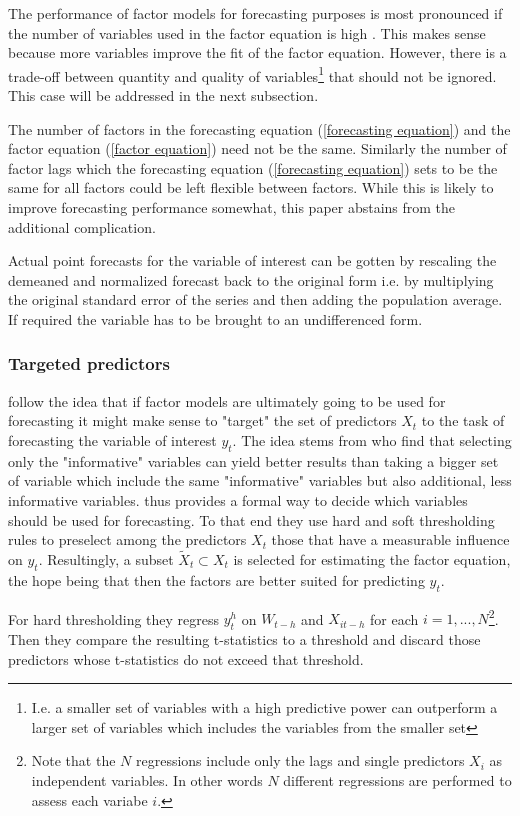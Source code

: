 \documentclass[12pt]{article}
\begin{document}
The performance of factor models for forecasting purposes is most pronounced if the number of variables used in the factor equation is high \citep{stock2011dynamic}. This makes sense because more variables improve the fit of the factor equation. However, there is a trade-off between quantity and quality of variables\footnote{I.e. a smaller set of variables with a high predictive power can outperform a larger set of variables which includes the variables from the smaller set} that should not be ignored. This case will be addressed in the next subsection.

The number of factors in the forecasting equation (\ref{forecasting equation}) and the factor equation (\ref{factor equation}) need not be the same. Similarly the number of factor lags which the forecasting equation (\ref{forecasting equation}) sets to be the same for all factors could be left flexible between factors. While this is likely to improve forecasting performance somewhat, this paper abstains from the additional complication.

Actual point forecasts for the variable of interest can be gotten by rescaling the demeaned and normalized forecast back to the original form i.e. by multiplying the original standard error of the series and then adding the population average. If required the variable has to be brought to an undifferenced form.

\subsubsection{Targeted predictors}
\citet{bai2008forecasting} follow the idea that if factor models are ultimately going to be used for forecasting it might make sense to "target" the set of predictors $X_t$ to the task of forecasting the variable of interest $y_t$. The idea stems from \citet{boivin2006more} who find that selecting only the "informative" variables can yield better results than taking a bigger set of variable which include the same "informative" variables but also additional, less informative variables. \citet{bai2008forecasting} thus provides a formal way to decide which variables should be used for forecasting. To that end they use hard and soft thresholding rules to preselect among the predictors $X_t$ those that have a measurable influence on $y_t$. Resultingly, a subset $\tilde X_t \subset X_t$ is selected for estimating the factor equation, the hope being that then the factors are better suited for predicting $y_t$.

For hard thresholding they regress $y_t^h$ on $W_{t-h}$ and $X_{it-h}$ for each $i=1, ..., N$\footnote{Note that the $N$ regressions include only the lags and single predictors $X_i$ as independent variables. In other words $N$ different regressions are performed to assess each variabe $i$.}. Then they compare the resulting t-statistics to a threshold and discard those predictors whose t-statistics do not exceed that threshold. 
\end{document}
